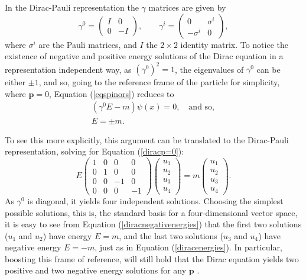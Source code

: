 In the Dirac-Pauli representation the $\gamma$ matrices are given by
\begin{equation*}
\gamma^0= \left( \begin{array}{ccc}
I & 0\\
0 & -I\end{array} \right),\qquad
\gamma^i= \left( \begin{array}{ccc}
0 & \sigma^i \\
-\sigma^i & 0\end{array} \right),
\end{equation*}
where $\sigma^i$ are the Pauli matrices, and $I$ the $2\times2$ identity matrix. To notice the existence of negative and positive energy solutions of the Dirac equation in a representation independent way, as $(\gamma^0)^2 = 1$, the eigenvalues of $\gamma^0$ can be either $\pm1$, and so, going to the reference frame of the particle for simplicity, where $\bm{p} = 0$, Equation (\ref{eqspinors}) reduces to
\begin{gather}
    \label{diracp=0}
    (\gamma^0E - m)\psi(x) = 0, \quad \textrm{and so}, \\
    \label{diracenergies}
    E = \pm m.
\end{gather}

To see this more explicitly, this argument can be translated to the Dirac-Pauli representation, solving for Equation (\ref{diracp=0}):
\begin{equation}
\label{diracnegativenergies}
E\left( \begin{array}{ccccc}
1 & 0 & 0 & 0 \\
0 & 1 & 0 & 0 \\
0 & 0 & -1 & 0 \\
0 & 0 & 0 & -1 \end{array} \right)
\left( \begin{array}{c}
u_1 \\
u_2 \\
u_3 \\
u_4 \end{array} \right) = m
\left( \begin{array}{c}
u_1 \\
u_2 \\
u_3 \\
u_4 \end{array} \right).
\end{equation}
As $\gamma^0$ is diagonal, it yields four independent solutions. Choosing the simplest possible solutions, this is, the standard basis for a four-dimensional vector space, it is easy to see from Equation (\ref{diracnegativenergies}) that the first two solutions ($u_1$ and $u_2$) have energy $E=m$, and the last two solutions ($u_3$ and $u_4$) have negative energy $E=-m$, just as in Equation (\ref{diracenergies}). In particular, boosting this frame of reference, will still hold that the Dirac equation yields two positive and two negative energy solutions for any $\bm{p}$ \cite{Thomson}.

